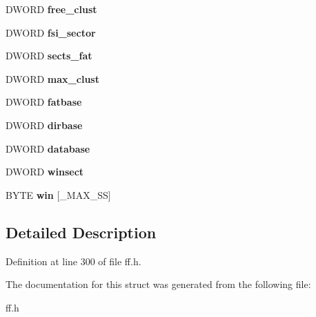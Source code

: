 \begin{DoxyCompactItemize}
\item 
\hypertarget{struct__FATFS___ab4683eb0c78ebe567a3823a33b99d3a0}{D\-W\-O\-R\-D {\bfseries free\-\_\-clust}}\label{struct__FATFS___ab4683eb0c78ebe567a3823a33b99d3a0}

\item 
\hypertarget{struct__FATFS___afcdcd82b808901178240906cc1788678}{D\-W\-O\-R\-D {\bfseries fsi\-\_\-sector}}\label{struct__FATFS___afcdcd82b808901178240906cc1788678}

\item 
\hypertarget{struct__FATFS___a505828a9a09e763849d74e9d49e016b9}{D\-W\-O\-R\-D {\bfseries sects\-\_\-fat}}\label{struct__FATFS___a505828a9a09e763849d74e9d49e016b9}

\item 
\hypertarget{struct__FATFS___a9646c349514958a9c5eb900ea8928265}{D\-W\-O\-R\-D {\bfseries max\-\_\-clust}}\label{struct__FATFS___a9646c349514958a9c5eb900ea8928265}

\item 
\hypertarget{struct__FATFS___a482490b7ab5ceadd9c7b1c56903f507d}{D\-W\-O\-R\-D {\bfseries fatbase}}\label{struct__FATFS___a482490b7ab5ceadd9c7b1c56903f507d}

\item 
\hypertarget{struct__FATFS___a67f9b7cf497be3625a33664b4b78fb4d}{D\-W\-O\-R\-D {\bfseries dirbase}}\label{struct__FATFS___a67f9b7cf497be3625a33664b4b78fb4d}

\item 
\hypertarget{struct__FATFS___a2a3eb7a44f26fb94303842d499ba3c17}{D\-W\-O\-R\-D {\bfseries database}}\label{struct__FATFS___a2a3eb7a44f26fb94303842d499ba3c17}

\item 
\hypertarget{struct__FATFS___a53c2fc178b68c12f1b890e58d5e535b8}{D\-W\-O\-R\-D {\bfseries winsect}}\label{struct__FATFS___a53c2fc178b68c12f1b890e58d5e535b8}

\item 
\hypertarget{struct__FATFS___a9bd9771121b1c62afcaa8c0ec9d2439e}{B\-Y\-T\-E {\bfseries win} \mbox{[}\-\_\-\-M\-A\-X\-\_\-\-S\-S\mbox{]}}\label{struct__FATFS___a9bd9771121b1c62afcaa8c0ec9d2439e}

\end{DoxyCompactItemize}


\subsection{Detailed Description}


Definition at line 300 of file ff.\-h.



The documentation for this struct was generated from the following file\-:\begin{DoxyCompactItemize}
\item 
ff.\-h\end{DoxyCompactItemize}
